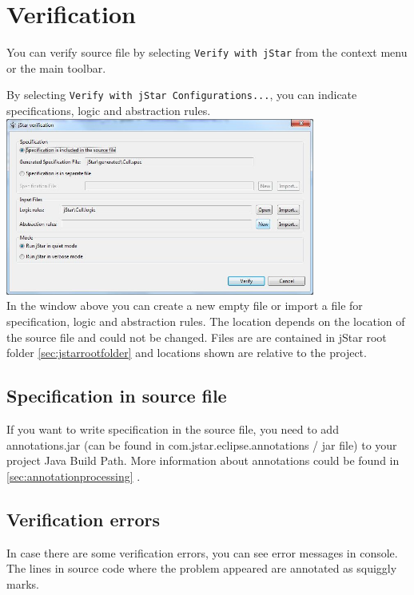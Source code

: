 \documentclass{article}
\begin{document}
\section{Verification}
\label{sec:verification}
You can verify source file by selecting \texttt{Verify with jStar} from the context menu or the main toolbar. 

By selecting \texttt{Verify with jStar Configurations...}, you can indicate specifications, logic and abstraction rules.\\ 

\includegraphics[width=4in]{images/verificationWindow.jpg}\\

In the window above you can create a new empty file or import a file for specification, logic and abstraction rules. The location depends on the location of the source file and could not be changed. Files are  are contained in jStar root folder \ref{sec:jstarrootfolder} and locations shown are relative to the project.

\subsection{Specification in source file}
\label{sec:specinsource}

If you want to write specification in the source file, you need to add annotations.jar (can be found in com.jstar.eclipse.annotations / jar file) to your project Java Build Path. More information about annotations could be found in \ref{sec:annotationprocessing} .

\subsection {Verification errors}

In case there are some verification errors, you can see error messages in console. The lines in source code where the problem appeared are annotated as squiggly marks.\\
\end{document}

